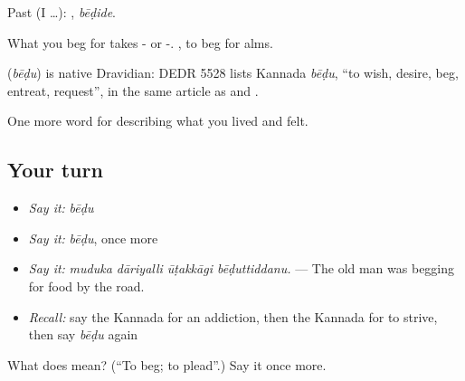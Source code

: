 Past (I …): , \emph{bēḍide}.

What you beg for takes - or -.  , to beg for alms.

\begin{cousinweb}
\textbf{} (\emph{bēḍu}) is native Dravidian: DEDR 5528 lists Kannada \emph{bēḍu}, \textquotedblleft{}to wish, desire, beg, entreat, request\textquotedblright{}, in the same article as  and .
\end{cousinweb}

\begin{grammarlens}[title={What you've built}]
One more word for describing what you lived and felt.
\end{grammarlens}

\subsection*{Your turn}
\begin{itemize}
\raggedright
  \item \emph{Say it:} \emph{bēḍu}
  \item \emph{Say it:} \emph{bēḍu}, once more
  \item \emph{Say it:} \emph{muduka dāriyalli ūṭakkāgi bēḍuttiddanu.} — The old man was begging for food by the road.
  \item \emph{Recall:} say the Kannada for an addiction, then the Kannada for to strive, then say \emph{bēḍu} again
\end{itemize}

\begin{tcolorbox}[breakable,colback=teal!4,colframe=teal!35!black,title={Before you move on}]
What does  mean? (\textquotedblleft{}To beg; to plead\textquotedblright{}.) Say it once more.
\end{tcolorbox}
